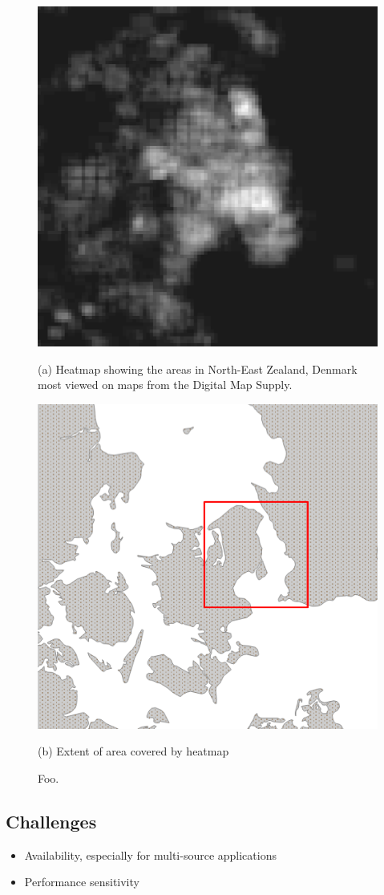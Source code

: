 \documentclass[11pt, oneside]{report}
\begin{document}
\begin{figure}[tb]
  \begin{minipage}{0.50\linewidth}
    \centerline{\includegraphics[width=0.6\linewidth]{./figs-thesis/tileheat_heatmap_sjaelland.png}}
    \centerline{(a) Heatmap showing the areas in North-East Zealand, Denmark most viewed on maps from the Digital Map Supply.}
  \end{minipage} \hfill
  \begin{minipage}{0.50\linewidth}
    \centerline{\includegraphics[width=0.6\linewidth]{./figs-thesis/heat_extent.png}}
    \centerline{(b) Extent of area covered by heatmap}
  \end{minipage}
  \vspace{-0ex}
  \caption{Foo.}
  \label{fig:cvl:visualization:airport}
  \vspace{-2ex}
\end{figure}


\subsection{Challenges}
\begin{itemize}
\item Availability, especially for multi-source applications
\item Performance sensitivity
\end{itemize}	
\end{document}
